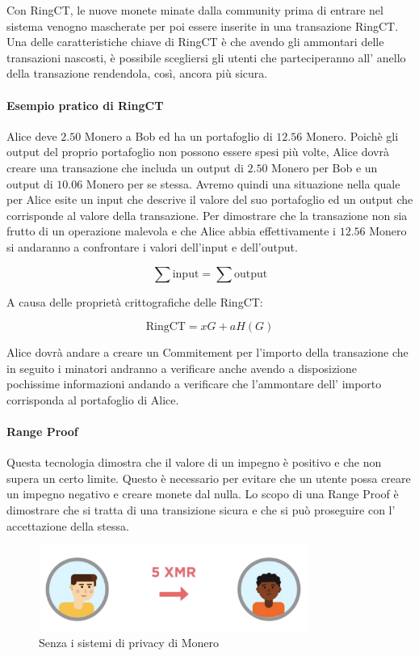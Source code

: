\documentclass[12pt,a4paper]{article}
\begin{document}
Con RingCT, le nuove monete minate dalla community prima di entrare nel sistema venogno mascherate per poi essere inserite in una transazione RingCT. 
Una delle caratteristiche chiave di RingCT è che avendo gli ammontari delle transazioni nascosti, è possibile scegliersi gli utenti che parteciperanno all' anello della transazione rendendola, così, ancora più sicura.

\paragraph{Esempio pratico di RingCT}

Alice deve $ 2.50 $ Monero a Bob ed ha un portafoglio di $ 12.56 $ Monero. Poichè gli output del proprio portafoglio non possono essere spesi più volte, Alice dovrà creare una transazione che includa un output di $ 2.50 $ Monero per Bob e un output di $ 10.06 $ Monero per se stessa. Avremo quindi una situazione nella quale per Alice esite un input che descrive il valore del suo portafoglio ed un output che corrisponde al valore della transazione. Per dimostrare che la transazione non sia frutto di un operazione malevola e che Alice abbia effettivamente i $ 12.56 $ Monero si andaranno a confrontare i valori dell'input e dell'output.

$$ \sum \text{input} = \sum \text{output} $$

A causa delle proprietà crittografiche delle RingCT: 

$$ \text{RingCT} = xG + aH(G) $$ 

Alice dovrà andare a creare un Commitement per l'importo della transazione che in seguito i minatori andranno a verificare anche avendo a disposizione pochissime informazioni andando a verificare che l'ammontare dell' importo corrisponda al portafoglio di Alice.

\paragraph{Range Proof}

Questa tecnologia dimostra che il valore di un impegno è positivo e che non supera un certo limite. Questo è necessario per evitare che un utente possa creare un impegno negativo e creare monete dal nulla.
Lo scopo di una Range Proof è dimostrare che si tratta di una transizione sicura e che si può proseguire con l' accettazione della stessa.

\begin{figure}[ht]
    \centering
    \includegraphics[width=0.79\textwidth]{./images/before.png}
    \caption{Senza i sistemi di privacy di Monero}
    \label{fig:summary}
\end{figure}
\end{document}
